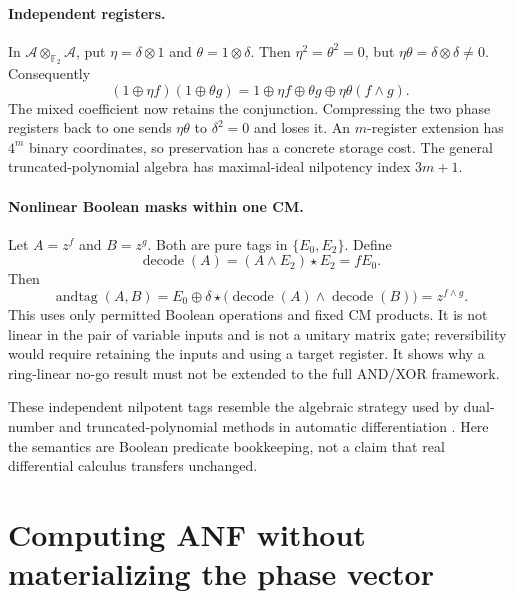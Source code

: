 \documentclass[11pt,a4paper]{article}
\theoremstyle{definition}\newtheorem{definition}[theorem]{Definition}
\theoremstyle{remark}\newtheorem{remark}[theorem]{Remark}
\newcommand{\F}{\mathbb F}
\newcommand{\alg}{\mathcal A}
\numberwithin{equation}{section}
\begin{document}
\paragraph{Independent registers.}
In $\alg\otimes_{\F_2}\alg$, put $\eta=\delta\otimes1$ and $\theta=1\otimes\delta$. Then $\eta^2=\theta^2=0$, but $\eta\theta=\delta\otimes\delta\ne0$. Consequently
\begin{equation}\label{eq:independent}
 (1\oplus\eta f)(1\oplus\theta g)
 =1\oplus\eta f\oplus\theta g\oplus\eta\theta(f\land g).
\end{equation}
The mixed coefficient now retains the conjunction. Compressing the two phase registers back to one sends $\eta\theta$ to $\delta^2=0$ and loses it. An $m$-register extension has $4^m$ binary coordinates, so preservation has a concrete storage cost. The general truncated-polynomial algebra has maximal-ideal nilpotency index $3m+1$.

\paragraph{Nonlinear Boolean masks within one CM.}
Let $A=z^f$ and $B=z^g$. Both are pure tags in $\{E_0,E_2\}$. Define
\begin{equation}
 \operatorname{decode}(A)=(A\land E_2)\star E_2=fE_0.
\end{equation}
Then
\begin{equation}\label{eq:tagand}
 \operatorname{andtag}(A,B)=E_0\oplus\delta\star
 \big(\operatorname{decode}(A)\land\operatorname{decode}(B)\big)
 =z^{f\land g}.
\end{equation}
This uses only permitted Boolean operations and fixed CM products. It is not linear in the pair of variable inputs and is not a unitary matrix gate; reversibility would require retaining the inputs and using a target register. It shows why a ring-linear no-go result must not be extended to the full AND/XOR framework.

These independent nilpotent tags resemble the algebraic strategy used by dual-number and truncated-polynomial methods in automatic differentiation \cite{ad}. Here the semantics are Boolean predicate bookkeeping, not a claim that real differential calculus transfers unchanged.

\section{Computing ANF without materializing the phase vector}\label{sec:compiler}
\end{document}
